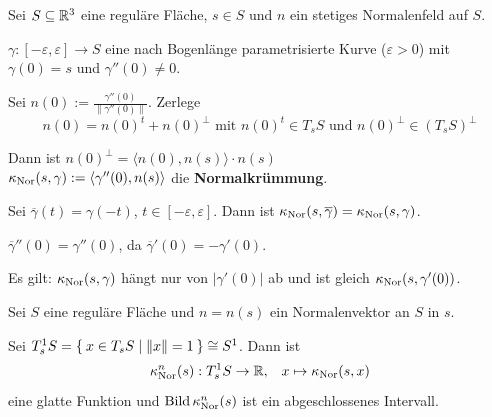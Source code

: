 \begin{definition}\label{def:18.4}%
    Sei $S \subseteq \mathbb{R}^3$ eine reguläre Fläche, $s \in S$ und $n$ ein
    stetiges Normalenfeld auf $S$.

    $\gamma:[-\varepsilon, \varepsilon] \rightarrow S$ eine nach
    Bogenlänge parametrisierte Kurve ($\varepsilon > 0$) mit
    $\gamma(0) = s$ und $\gamma''(0) \neq 0$.

    Sei $n(0) := \frac{\gamma''(0)}{\|\gamma''(0)\|}$. Zerlege
    \[n(0) = n(0)^t + n(0)^\perp \text{ mit } n(0)^t \in T_s S \text{ und } n(0)^\perp \in (T_s S)^\perp\]

    Dann ist $n(0)^\perp = \langle n(0), n(s) \rangle \cdot n(s)$\\
    $\kappa_{\textnormal{Nor}}(s, \gamma) := \langle \gamma''(0), n(s) \rangle$
    die \textbf{Normalkrümmung}.
\end{definition}

\begin{bemerkung}
    Sei $\overline{\gamma}(t) = \gamma(-t)$, $t \in [- \varepsilon, \varepsilon]$.
    Dann ist $\kappa_{\textnormal{Nor}}(s, \overline{\gamma}) = \kappa_{\textnormal{Nor}}(s, \gamma)$.
\end{bemerkung}

\begin{beweis}
    $\overline{\gamma}''(0) = \gamma''(0)$, da $\overline{\gamma}'(0) = - \gamma'(0)$.

    Es gilt: $\kappa_{\textnormal{Nor}}(s,\gamma)$ hängt nur von $|\gamma'(0)|$ ab
    und ist gleich $\kappa_{\textnormal{Nor}}(s, \gamma'(0))$.
\end{beweis}

\begin{bemerkung}%
    Sei $S$ eine reguläre Fläche und $n=n(s)$ ein Normalenvektor an 
    $S$ in $s$.

    Sei $T_{s}^{1} S = \Set{x \in T_s S | \|x\| = 1} \cong S^1$.
    Dann ist 
    \[ \kappa_{\textnormal{Nor}}^n(s): T^1_s S \rightarrow \mathbb{R}, \;\;\; x \mapsto \kappa_{\textnormal{Nor}}(s,x)\]
    eine glatte Funktion und 
    $\operatorname{Bild} \kappa_{\textnormal{Nor}}^n(s)$ ist ein abgeschlossenes Intervall.
\end{bemerkung}

